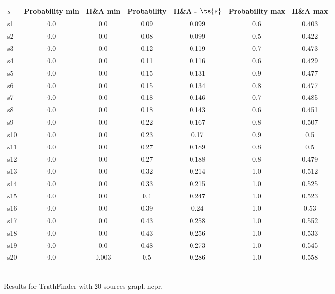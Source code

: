 \documentclass{article}
\begin{document}
\noindent\begin{tabular}{|l|c|c|c|c|c|c|}
\hline
$s$& Probability min & H\&A min & Probability & H\&A - $\ts{s}$ & Probability max & H\&A max\\
\hline
s1 &0.0 & 0.0 & 0.09 & 0.099 & 0.6 & 0.403\\
\hline
s2 &0.0 & 0.0 & 0.08 & 0.099 & 0.5 & 0.422\\
\hline
s3 &0.0 & 0.0 & 0.12 & 0.119 & 0.7 & 0.473\\
\hline
s4 &0.0 & 0.0 & 0.11 & 0.116 & 0.6 & 0.429\\
\hline
s5 &0.0 & 0.0 & 0.15 & 0.131 & 0.9 & 0.477\\
\hline
s6 &0.0 & 0.0 & 0.15 & 0.134 & 0.8 & 0.477\\
\hline
s7 &0.0 & 0.0 & 0.18 & 0.146 & 0.7 & 0.485\\
\hline
s8 &0.0 & 0.0 & 0.18 & 0.143 & 0.6 & 0.451\\
\hline
s9 &0.0 & 0.0 & 0.22 & 0.167 & 0.8 & 0.507\\
\hline
s10 &0.0 & 0.0 & 0.23 & 0.17 & 0.9 & 0.5\\
\hline
s11 &0.0 & 0.0 & 0.27 & 0.189 & 0.8 & 0.5\\
\hline
s12 &0.0 & 0.0 & 0.27 & 0.188 & 0.8 & 0.479\\
\hline
s13 &0.0 & 0.0 & 0.32 & 0.214 & 1.0 & 0.512\\
\hline
s14 &0.0 & 0.0 & 0.33 & 0.215 & 1.0 & 0.525\\
\hline
s15 &0.0 & 0.0 & 0.4 & 0.247 & 1.0 & 0.523\\
\hline
s16 &0.0 & 0.0 & 0.39 & 0.24 & 1.0 & 0.53\\
\hline
s17 &0.0 & 0.0 & 0.43 & 0.258 & 1.0 & 0.552\\
\hline
s18 &0.0 & 0.0 & 0.43 & 0.256 & 1.0 & 0.533\\
\hline
s19 &0.0 & 0.0 & 0.48 & 0.273 & 1.0 & 0.545\\
\hline
s20 &0.0 & 0.003 & 0.5 & 0.286 & 1.0 & 0.558\\
\hline
\end{tabular}\\

\noindent Results for TruthFinder with 20 sources graph ncpr.
\end{document}

